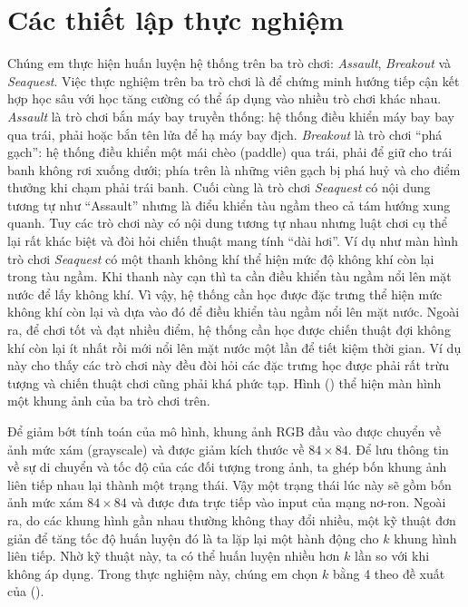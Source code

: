 \section{Các thiết lập thực nghiệm}
	Chúng em thực hiện huấn luyện hệ thống trên ba trò chơi: \textit{Assault}, \textit{Breakout} và \textit{Seaquest}.
	Việc thực nghiệm trên ba trò chơi là để chứng minh hướng tiếp cận kết hợp học sâu với học tăng cường có thể áp dụng vào nhiều trò chơi khác nhau.
	\textit{Assault} là trò chơi bắn máy bay truyền thống: hệ thống điều khiển máy bay bay qua trái, phải hoặc bắn tên lửa để hạ máy bay địch.
	\textit{Breakout} là trò chơi ``phá gạch'': hệ thống điều khiển một mái chèo (paddle) qua trái, phải để giữ cho trái banh không rơi xuống dưới; phía trên là những viên gạch bị phá huỷ và cho điểm thưởng khi chạm phải trái banh.
	Cuối cùng là trò chơi \textit{Seaquest} có nội dung tương tự như ``Assault'' nhưng là điểu khiển tàu ngầm theo cả tám hướng xung quanh.
	Tuy các trò chơi này có nội dung tương tự nhau nhưng luật chơi cụ thể lại rất khác biệt và đòi hỏi chiến thuật mang tính ``dài hơi''.
	Ví dụ như màn hình trò chơi \textit{Seaquest} có một thanh không khí thể hiện mức độ không khí còn lại trong tàu ngầm.
	Khi thanh này cạn thì ta cần điều khiển tàu ngầm nổi lên mặt nước để lấy không khí.
	Vì vậy, hệ thống cần học được đặc trưng thể hiện mức không khí còn lại và dựa vào đó để điều khiển tàu ngầm nổi lên mặt nước.
	Ngoài ra, để chơi tốt và đạt nhiều điểm, hệ thống cần học được chiến thuật đợi không khí còn lại ít nhất rồi mới nổi lên mặt nước một lần để tiết kiệm thời gian.
	Ví dụ này cho thấy các trò chơi này đều đòi hỏi các đặc trưng học được phải rất trừu tượng và chiến thuật chơi cũng phải khá phức tạp.
	Hình () thể hiện màn hình một khung ảnh của ba trò chơi trên.
	
	Để giảm bớt tính toán của mô hình, khung ảnh RGB đầu vào được chuyển về ảnh mức xám (grayscale) và được giảm kích thước về $84\times84$.
	Để lưu thông tin về sự di chuyển và tốc độ của các đối tượng trong ảnh, ta ghép bốn khung ảnh liên tiếp nhau lại thành một trạng thái.
	Vậy một trạng thái lúc này sẽ gồm bốn ảnh mức xám $84\times84$ và được đưa trực tiếp vào input của mạng nơ-ron.
	Ngoài ra, do các khung hình gần nhau thường không thay đổi nhiều, một kỹ thuật đơn giản để tăng tốc độ huấn luyện đó là ta lặp lại một hành động cho $k$ khung hình liên tiếp.
	Nhờ kỹ thuật này, ta có thể huấn luyện nhiều hơn $k$ lần so với khi không áp dụng.
	Trong thực nghiệm này, chúng em chọn $k$ bằng 4 theo đề xuất của (\cite{mnih2013playing}).
	

